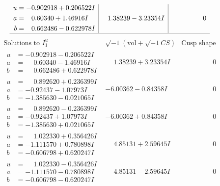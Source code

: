 \documentclass[1p]{elsarticle_modified}
\theoremstyle{definition}
\newcommand{\I}{\sqrt{-1}}
\begin{document}
$$\begin{array}{c|c|c}
\begin{aligned}
u &= -0.902918 + 0.206522 I \\
a &= \phantom{-}0.60340 + 1.46916 I \\
b &= \phantom{-}0.662486 - 0.622978 I\end{aligned}
 & \phantom{-}1.38239 - 3.23354 I & \phantom{-0.000000 } 0\\
 \hline 
 \end{array}$$\newpage$$\begin{array}{c|c|c}  
\text{Solutions to }I^u_{1}& \I (\text{vol} + \sqrt{-1}CS) & \text{Cusp shape}\\
 \hline 
\begin{aligned}
u &= -0.902918 - 0.206522 I \\
a &= \phantom{-}0.60340 - 1.46916 I \\
b &= \phantom{-}0.662486 + 0.622978 I\end{aligned}
 & \phantom{-}1.38239 + 3.23354 I & \phantom{-0.000000 } 0 \\ \hline\begin{aligned}
u &= \phantom{-}0.892620 + 0.236399 I \\
a &= -0.92437 - 1.07973 I \\
b &= -1.385630 - 0.021065 I\end{aligned}
 & -6.00362 - 0.84358 I & \phantom{-0.000000 } 0 \\ \hline\begin{aligned}
u &= \phantom{-}0.892620 - 0.236399 I \\
a &= -0.92437 + 1.07973 I \\
b &= -1.385630 + 0.021065 I\end{aligned}
 & -6.00362 + 0.84358 I & \phantom{-0.000000 } 0 \\ \hline\begin{aligned}
u &= \phantom{-}1.022330 + 0.356426 I \\
a &= -1.111570 + 0.780898 I \\
b &= -0.606798 + 0.620247 I\end{aligned}
 & \phantom{-}4.85131 + 2.59645 I & \phantom{-0.000000 } 0 \\ \hline\begin{aligned}
u &= \phantom{-}1.022330 - 0.356426 I \\
a &= -1.111570 - 0.780898 I \\
b &= -0.606798 - 0.620247 I\end{aligned}
 & \phantom{-}4.85131 - 2.59645 I & \phantom{-0.000000 } 0 \\ \hline\begin{aligned}

\end{aligned}
\end{array}$$
\end{document}
